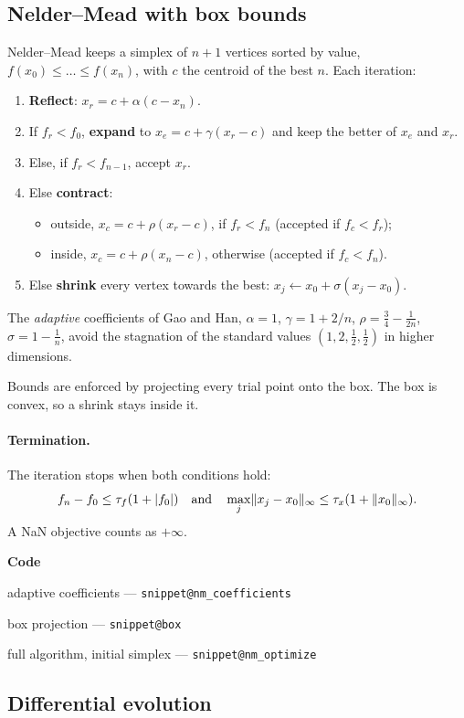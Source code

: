 \documentclass[11pt,a4paper]{article}
\makeatletter
\newcommand{\snippetsource}[1]{\csname snippet@#1\endcsname}
\newcommand{\snippet}[3]{%
  }
\newenvironment{codepointers}{%
  \par\smallskip\begingroup\footnotesize\noindent\textcolor{blue!50!black}{\textbf{Code}}\par\nopagebreak
  \begin{list}{}{\setlength{\leftmargin}{1.2em}\setlength{\itemsep}{0pt}\setlength{\parsep}{0pt}\setlength{\topsep}{1pt}}}%
  {\end{list}\endgroup\smallskip}
\newcommand{\codeitem}[2]{\item #2 --- \texttt{\snippetsource{#1}}}
\makeatother
\begin{document}
\subsection{Nelder--Mead with box bounds}
Nelder--Mead keeps a simplex of $n+1$ vertices sorted by value,
$f(x_0)\le\dots\le f(x_n)$, with $c$ the centroid of the best $n$. Each iteration:
\begin{enumerate}
  \item \textbf{Reflect}: $x_r=c+\alpha(c-x_n)$.
  \item If $f_r<f_0$, \textbf{expand} to $x_e=c+\gamma(x_r-c)$ and keep the better of
        $x_e$ and $x_r$.
  \item Else, if $f_r<f_{n-1}$, accept $x_r$.
  \item Else \textbf{contract}:
        \begin{itemize}
          \item outside, $x_c=c+\rho(x_r-c)$, if $f_r<f_n$ (accepted if $f_c<f_r$);
          \item inside, $x_c=c+\rho(x_n-c)$, otherwise (accepted if $f_c<f_n$).
        \end{itemize}
  \item Else \textbf{shrink} every vertex towards the best:
        $x_j\leftarrow x_0+\sigma(x_j-x_0)$.
\end{enumerate}
The \emph{adaptive} coefficients of Gao and Han, $\alpha=1$, $\gamma=1+2/n$,
$\rho=\tfrac34-\tfrac1{2n}$, $\sigma=1-\tfrac1n$, avoid the stagnation of the standard
values $(1,2,\tfrac12,\tfrac12)$ in higher dimensions.

Bounds are enforced by projecting every trial point onto the box. The box is convex, so a
shrink stays inside it.

\paragraph{Termination.} The iteration stops when both conditions hold:
\[
  f_n-f_0\le\tau_f(1+|f_0|)\quad\text{and}\quad\max_j\lVert x_j-x_0\rVert_\infty\le\tau_x(1+\lVert x_0\rVert_\infty).
\]
A NaN objective counts as $+\infty$.
\snippet{nm_step}{C++}{One Nelder--Mead iteration}
\begin{codepointers}
  \codeitem{nm_coefficients}{adaptive coefficients}
  \codeitem{box}{box projection}
  \codeitem{nm_optimize}{full algorithm, initial simplex}
\end{codepointers}

\subsection{Differential evolution}
\end{document}
